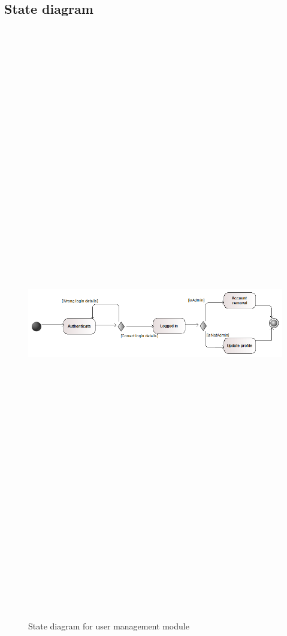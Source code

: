 \subsection{State diagram}
\begin{figure}[H]
	\includegraphics[width=12cm,height=26cm,keepaspectratio]{Users/Pictures/User_State_Diagram.png}
	\caption{State diagram for user management module}\label{visina8}
\end{figure}

